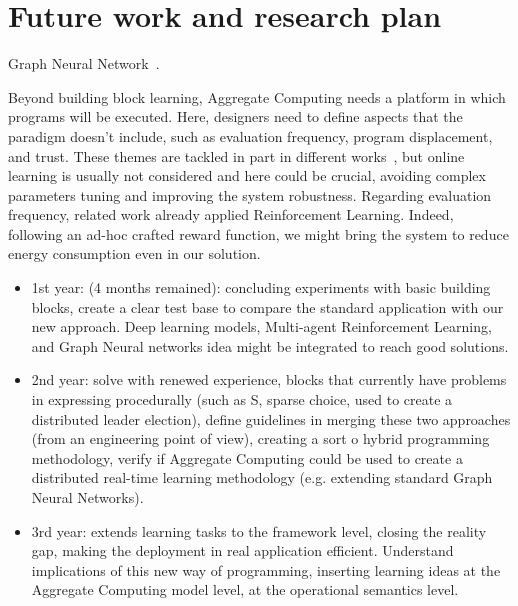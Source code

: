 \documentclass[conference]{IEEEtran}
\begin{document}
\section{Future work and research plan}
Graph Neural Network~\cite{DBLP:journals/tnn/ScarselliGTHM09}.

Beyond building block learning, Aggregate Computing needs a platform in which programs will be executed. 
Here, designers need to define aspects that the paradigm doesn't include, 
such as evaluation frequency, program displacement, and trust. 
These themes are tackled in part in different works~\cite{DBLP:journals/scp/CasadeiAV18, DBLP:journals/fi/CasadeiPPVW20, DBLP:journals/corr/abs-2012-13806}, 
but online learning is usually not considered and here could be crucial, 
avoiding complex parameters tuning and improving the system robustness.
Regarding evaluation frequency, related work already applied Reinforcement Learning. 
Indeed, following an ad-hoc crafted reward function, we might bring the system to reduce energy consumption even in our solution.
\begin{itemize}
    \item 1st year: (4 months remained): concluding experiments with basic building blocks, create a clear test base to compare the standard application with our new approach. Deep learning models, Multi-agent Reinforcement Learning, and Graph Neural networks idea might be integrated to reach good solutions.
    \item 2nd year: solve with renewed experience, blocks that currently have problems in expressing procedurally (such as S, sparse choice, used to create a distributed leader election),
    define guidelines in merging these two approaches (from an engineering point of view), creating a sort o hybrid programming methodology, verify if Aggregate Computing could be used to create a distributed real-time learning methodology (e.g. extending standard Graph Neural Networks).
    \item 3rd year: extends learning tasks to the framework level, closing the reality gap, making the deployment in real application efficient. Understand implications of this new way of programming, inserting learning ideas at the Aggregate Computing model level, at the operational semantics level. 
\end{itemize}



\end{document}
